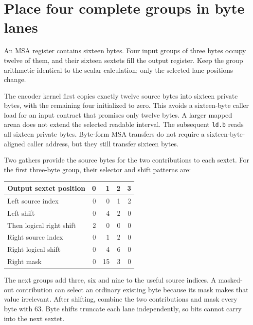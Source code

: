 \section{Place four complete groups in byte lanes}
An MSA register contains sixteen bytes. Four input groups of three bytes occupy twelve
of them, and their sixteen sextets fill the output register. Keep the group arithmetic
identical to the scalar calculation; only the selected lane positions change.

The encoder kernel first copies exactly twelve source bytes into sixteen private bytes,
with the remaining four initialized to zero. This avoids a sixteen-byte caller load
for an input contract that promises only twelve bytes. A larger mapped arena does not
extend the selected readable interval. The subsequent \texttt{ld.b} reads all sixteen
private bytes. Byte-form MSA transfers do not require a sixteen-byte-aligned caller
address, but they still transfer sixteen bytes.

Two gathers provide the source bytes for the two contributions to each sextet. For the
first three-byte group, their selector and shift patterns are:
\begin{center}
  \begin{tabular}{lrrrr}
    Output sextet position   & 0 & 1  & 2 & 3 \\
    \hline
    Left source index        & 0 & 0  & 1 & 2 \\
    Left shift               & 0 & 4  & 2 & 0 \\
    Then logical right shift & 2 & 0  & 0 & 0 \\
    Right source index       & 0 & 1  & 2 & 0 \\
    Right logical shift      & 0 & 4  & 6 & 0 \\
    Right mask               & 0 & 15 & 3 & 0 \\
  \end{tabular}
\end{center}

The next groups add three, six and nine to the useful source indices. A masked-out
contribution can select an ordinary existing byte because its mask makes that value
irrelevant. After shifting, combine the two contributions and mask every byte with 63.
Byte shifts truncate each lane independently, so bits cannot carry into the next sextet.
